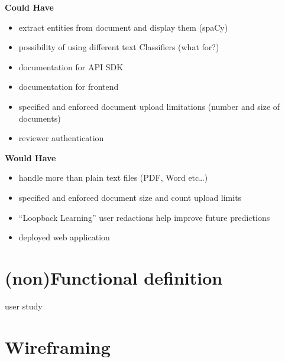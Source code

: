 \documentclass{l4proj}
\begin{document}
\vspace{0.5cm}

\begin{minipage}[t]{.5\linewidth}
    \centerline{\textbf{Could Have}}
    \begin{itemize}
        \item extract entities from document and display them (spaCy)
        \item possibility of using different text Classifiers (what for?)
        \item documentation for API SDK
        \item documentation for frontend
        \item specified and enforced document upload limitations (number and size of documents)
        \item reviewer authentication
    \end{itemize}
\end{minipage}
\hfill
\noindent
\begin{minipage}[t]{.5\linewidth}
    \centerline{\textbf{Would Have}}
    \begin{itemize}
        \item handle more than plain text files (PDF, Word etc…)
        \item specified and enforced document size and count upload limits
        \item ``Loopback Learning'' user redactions help improve future predictions
        \item deployed web application
    \end{itemize}
\end{minipage}

\section{(non)Functional definition}

user study

\section{Wireframing}
\end{document}
